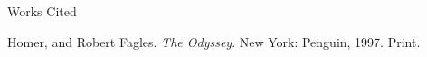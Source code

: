 \documentclass[12pt]{article}
\newcommand{\bibent}{\noindent \hangindent 40pt}
\newenvironment{workscited}{\newpage \begin{center} Works Cited \end{center}}{\newpage }
\begin{document}
\begin{flushleft}
\begin{workscited}

\bibent
Homer, and Robert Fagles. \textit{The Odyssey}. New York: Penguin, 1997. Print.


\end{workscited}

\end{flushleft}
\end{document}
